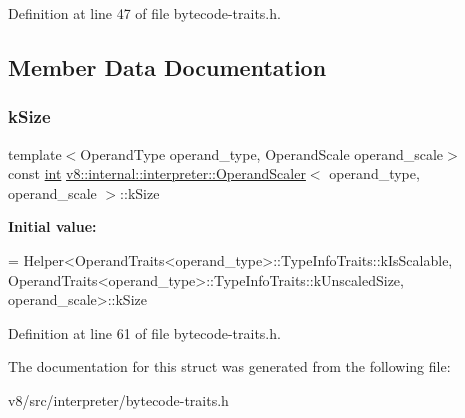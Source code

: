 Definition at line 47 of file bytecode-\/traits.\+h.



\subsection{Member Data Documentation}
\mbox{\label{structv8_1_1internal_1_1interpreter_1_1OperandScaler_a8e7bad5558ef958d84376ed6d472134b}} 
\subsubsection{\texorpdfstring{k\+Size}{kSize}}
{\footnotesize\ttfamily template$<$Operand\+Type operand\+\_\+type, Operand\+Scale operand\+\_\+scale$>$ \\
const \mbox{\hyperlink{classint}{int}} \mbox{\hyperlink{structv8_1_1internal_1_1interpreter_1_1OperandScaler}{v8\+::internal\+::interpreter\+::\+Operand\+Scaler}}$<$ operand\+\_\+type, operand\+\_\+scale $>$\+::k\+Size\hspace{0.3cm}{\ttfamily [static]}}

{\bfseries Initial value\+:}
\begin{DoxyCode}
=
      Helper<OperandTraits<operand\_type>::TypeInfoTraits::kIsScalable,
             OperandTraits<operand\_type>::TypeInfoTraits::kUnscaledSize,
             operand\_scale>::kSize
\end{DoxyCode}


Definition at line 61 of file bytecode-\/traits.\+h.



The documentation for this struct was generated from the following file\+:\begin{DoxyCompactItemize}
\item 
v8/src/interpreter/bytecode-\/traits.\+h\end{DoxyCompactItemize}
